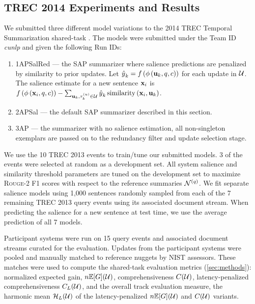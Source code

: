 \subsection{TREC 2014 Experiments and Results}



We submitted three different model variations to the 2014 TREC Temporal
Summarization shared-task \citep{aslam2015}. The models were submitted under
the Team ID \textit{cunlp} and given
the following Run IDs:
\begin{enumerate}
\item 1APSalRed --- the SAP summarizer where salience predictions are penalized by similarity to prior updates. Let ${\hat{y}}_k = f\left(\phi\left(\mathbf{u}_k,q,c\right)\right)$ for each update in $\mathcal{U}$. The 
salience estimate for a new sentence $\mathbf{x}_i$ is 
$f\left(\phi\left(\mathbf{x}_i,q,c\right)\right) - \sum_{\mathbf{u}_k, \tau^{(u)}_k \in \mathcal{U}} {\hat{y}}_k \operatorname{similarity}\left(\mathbf{x}_i,\mathbf{u}_k \right)$. 
\item 2APSal --- the default SAP summarizer described in this section.
\item 3AP --- the summarizer with no salience estimation, all non-singleton
 exemplars are passed on to the redundancy filter and update selection
stage.
\end{enumerate}

We use the 10 TREC 2013 events to train/tune our submitted models.
3 of the events were selected at random as
a development set. All system salience and similarity threshold parameters are
tuned on the development set to maximize \textsc{Rouge}-2 F1 scores with
respect to the reference summaries $\mathcal{N}^{(q)}$.
We fit separate salience models using 1,000 sentences randomly sampled from
each of the 7 remaining TREC 2013 query events using its associated document stream.
When predicting the salience for a new sentence at test time, we use the
average prediction of all 7 models. 


Participant systems were run on 15 query events and associated document streams
 curated for the evaluation.
Updates from the participant systems were pooled and manually matched 
to reference nuggets by NIST assessors. These matches were used to compute
the  shared-task evaluation metrics (\autoref{sec:methods}):
normalized expected gain, $n\mathbb{E}[G](\mathcal{U})$, comprehensiveness $C(\mathcal{U})$, latency-penalized comprehensiveness $C_L(\mathcal{U})$,
and the overall track evaluation measure, the harmonic mean $\mathcal{H}_L(\mathcal{U})$ of the latency-penalized
$n\mathbb{E}[G](\mathcal{U})$ and $C(\mathcal{U})$ variants.

